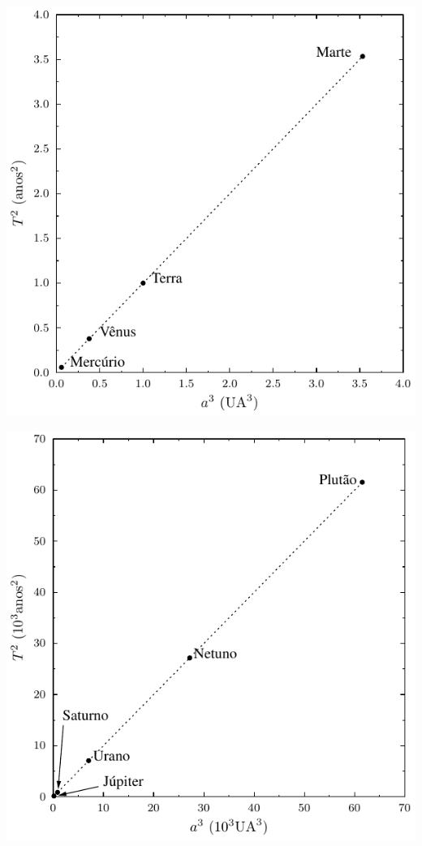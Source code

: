 \documentclass[a4paper]{article}
\begin{document}
\begin{respostas}
\begin{exercicio}
\begin{compactenum}[(a)]
  \noindent
    \begin{minipage}{0.45\textwidth}
    \includegraphics[width=\textwidth]{3a_lei_Kepler_Mercurio-Marte}
    \end{minipage}\hfill
    \begin{minipage}{0.45\textwidth}
    \includegraphics[width=\textwidth]{3a_lei_Kepler_Jupiter-Plutao}
    \end{minipage}
    

\end{compactenum}
\end{exercicio}
\end{respostas}
\end{document}
